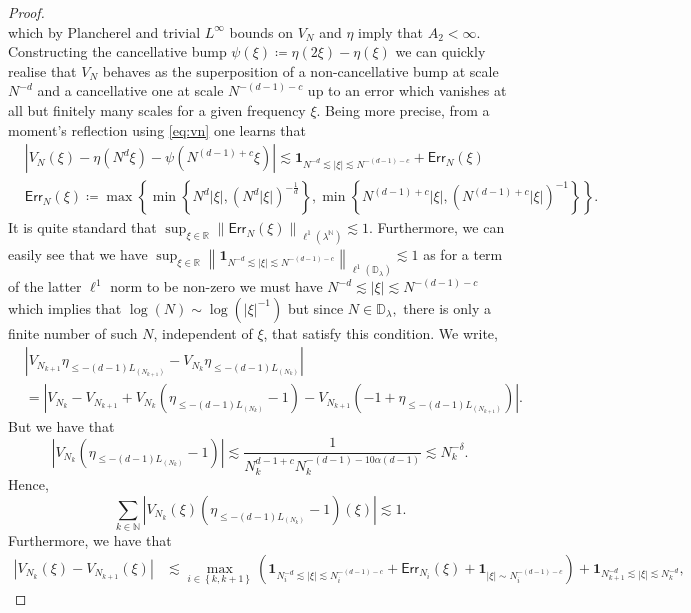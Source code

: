 \documentclass[12pt,leqno]{amsart}
\def\R {\mathbb{R}}
\def\N {\mathbb{N}}
\newcommand{\cic}{\bm}
\numberwithin{equation}{section}
\numberwithin{counter2}{section}
\theoremstyle{definition}
\theoremstyle{plain}
\begin{document}
\begin{proof}
\begin{equation}
		\end{equation}  which by Plancherel and trivial $L^{\infty}$ bounds on $V_{N} $ and $\eta$ imply that $A_{2}<\infty.$  Constructing the cancellative bump $\psi(\xi) \coloneqq \eta(2 \xi )-\eta(\xi )$ we can quickly realise that $V_ N$  behaves as the superposition of a non-cancellative bump at scale $N^{-d}$ and a cancellative one at scale $N^{-(d-1)-c}$ up to an error which vanishes at all but finitely many scales for a given frequency $\xi.$ Being more precise, from a moment's reflection using \eqref{eq:vn} one learns that
		\[ \begin{split}
			&	\left|V_N(\xi)-\eta(N^d \xi)-\psi(N^{(d-1)+c}\xi)\right|  \lesssim \cic{1}_{N^{-d}  \lesssim |\xi| \lesssim N^{-(d-1)-c} }+\mathsf{Err}_{N}(\xi)   \\ & \mathsf{Err}_{N}(\xi)   \coloneqq  \max \left\{ \min \left\{ N^{d}|\xi|, (N^{d}|\xi|)^{-\frac{1}{d}}   \right\},\min \left\{ N^{(d-1)+c}|\xi|, (N^{(d-1)+c}|\xi|)^{-1}   \right\}   \right\} .
		\end{split}\]
		It is quite standard that $\displaystyle{\sup_{\xi \in \R} }\left \| \mathsf{Err}_{N}(\xi) \right \|_{\ell^1(\lambda^{\N})} \lesssim 1.$ Furthermore, we can easily see that we have $\displaystyle{\sup_{\xi \in \R} \left \| \cic{1}_{N^{-d}  \lesssim |\xi| \lesssim N^{-(d-1)-c} } \right \|_{\ell^1(\mathbb{D}_{\lambda})}} \lesssim 1$ as for a term of the latter $\ell^1$ norm to be non-zero we must have $N^{-d}  \lesssim |\xi| \lesssim N^{-(d-1)-c} $ which implies that $ \log(N) \sim \log(|\xi|^{-1})$ but since $N \in \mathbb{D}_{\lambda}, $ there is only a finite number of such $N$, independent of $\xi$, that satisfy this condition. We write,	
        \begin{align*}
            &\left|V_{N_{k+1}} \eta_{\leq -(d-1)L_{(N_{k+1})}} - V_{N_k}\eta_{\leq -(d-1)L_{(N_k)}}\right|\\
            &= \left| V_{N_k}-V_{N_{k+1}}+V_{N_k}(\eta_{\le -(d-1) L_{(N_k)}}-1)-V_{N_{k+1}}(-1+\eta_{\le -(d-1) L_{(N_{k+1})}}) \right|.
        \end{align*}      But we have that \[ \left|V_{N_k}(\eta_{\le -(d-1) L_{(N_k)}}-1)\right| \lesssim \frac{1}{N_k^{d-1+c} N_k^{-(d-1)-10\alpha(d-1)} } \lesssim N_k^{-\delta}.  \] 
   Hence, \[\sum_{k \in \N} \left|V_{N_k}(\xi)(\eta_{\le -(d-1) L_{(N_k)}}-1)(\xi)\right| \lesssim 1. \] Furthermore, we have that \[ \begin{split}
			\left|V_{N_k}(\xi)-V_{N_{k+1}}(\xi)\right| & \lesssim \max_{i \in \left\{k,k+1\right\}}\left(\cic{1}_{N_{i}^{-d} \lesssim |\xi| \lesssim N_{i}^{-(d-1)-c} } + \mathsf{Err}_{N_i}(\xi)+\cic{1}_{|\xi| \sim N_i^{-(d-1)-c}}\right)+\cic{1}_{ N_{k+1}^{-d} \lesssim |\xi| \lesssim N_k^{-d} }, 

\end{split}\]
\end{proof}
\end{document}

